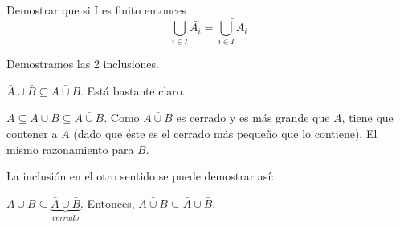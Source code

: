 \begin{problem}[11]
\ppart
\ppart

\solution
\spart
\spart  Demostrar que si I es finito entonces $$\bigcup_{i∈I} \bar{A_i} = \bar{\bigcup_{i∈I} A_i}$$

Demostramos las 2 inclusiones.

$\bar{A}∪\bar{B} \subseteq \bar{A∪B}$. Está bastante claro.

$A\subseteq A∪B \subseteq \bar{A∪B}$. Como $\bar{A∪B}$ es cerrado y es más grande que $A$, tiene que contener a $\bar{A}$ (dado que éste es el cerrado más pequeño que lo contiene). El mismo razonamiento para $B$.

La inclusión en el otro sentido se puede demostrar así:

$A∪B \subseteq \underbrace{\bar{A}∪\bar{B}}_{cerrado}$. Entonces, $\bar{A∪B}\subseteq \bar{A}∪\bar{B}$.
\end{problem}